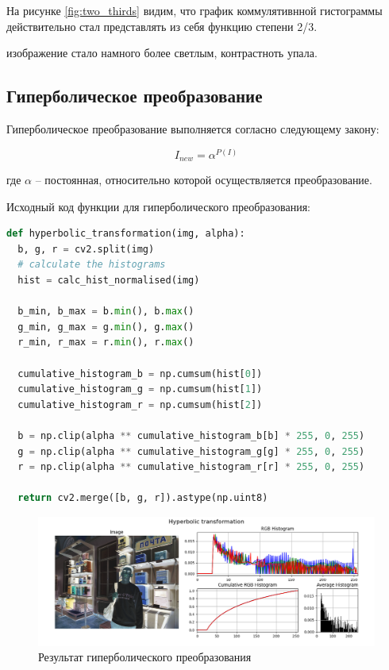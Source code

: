 \documentclass[a4paper, 12pt]{extarticle}
\begin{document}
На рисунке \ref{fig:two_thirds} видим, что график коммулятивнной гистограммы действительно стал представлять из себя функцию степени 2/3. 

изображение стало намного более светлым, контрастноть упала. 

\newpage
\subsection{Гиперболическое преобразование}  

Гиперболическое преобразование выполняется согласно следующему закону:

\begin{equation}
  I_{new} = \alpha^{P(I)}
\end{equation}

где $\alpha$ -- постоянная, относительно которой осуществляется преобразование.

Исходный код функции для гиперболического преобразования:

\begin{lstlisting}[language=Python]
def hyperbolic_transformation(img, alpha):
  b, g, r = cv2.split(img)
  # calculate the histograms
  hist = calc_hist_normalised(img)

  b_min, b_max = b.min(), b.max()
  g_min, g_max = g.min(), g.max()
  r_min, r_max = r.min(), r.max()

  cumulative_histogram_b = np.cumsum(hist[0]) 
  cumulative_histogram_g = np.cumsum(hist[1])
  cumulative_histogram_r = np.cumsum(hist[2])

  b = np.clip(alpha ** cumulative_histogram_b[b] * 255, 0, 255)
  g = np.clip(alpha ** cumulative_histogram_g[g] * 255, 0, 255)
  r = np.clip(alpha ** cumulative_histogram_r[r] * 255, 0, 255)
  
  return cv2.merge([b, g, r]).astype(np.uint8)
\end{lstlisting}

\begin{figure}[h]
    \centering
    \includegraphics[width=\textwidth]{../results/Hyperbolic transformation.png}
    \caption{Результат гиперболического преобразования}
    \label{fig:hyperbolic}
\end{figure}
\end{document}
